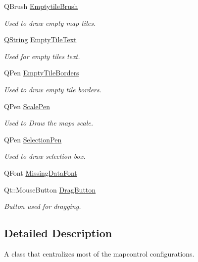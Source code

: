 \begin{DoxyCompactItemize}
\item 
Q\-Brush \hyperlink{group___o_p_map_widget_gad6bf957803f87dacf49bbff6998c72b6}{Emptytile\-Brush}
\begin{DoxyCompactList}\small\item\em Used to draw empty map tiles. \end{DoxyCompactList}\item 
\hyperlink{group___u_a_v_objects_plugin_gab9d252f49c333c94a72f97ce3105a32d}{Q\-String} \hyperlink{group___o_p_map_widget_ga3cee2f55adac9ad6424d5ea36a1fec54}{Empty\-Tile\-Text}
\begin{DoxyCompactList}\small\item\em Used for empty tiles text. \end{DoxyCompactList}\item 
Q\-Pen \hyperlink{group___o_p_map_widget_gae8db48d6cb03fedba7aa82d206dc82eb}{Empty\-Tile\-Borders}
\begin{DoxyCompactList}\small\item\em Used to draw empty tile borders. \end{DoxyCompactList}\item 
Q\-Pen \hyperlink{group___o_p_map_widget_gab4e66a6217ae69c3344a0af8578f5932}{Scale\-Pen}
\begin{DoxyCompactList}\small\item\em Used to Draw the maps scale. \end{DoxyCompactList}\item 
Q\-Pen \hyperlink{group___o_p_map_widget_gab3ccb3d980f16de07166bad27b8ff4dc}{Selection\-Pen}
\begin{DoxyCompactList}\small\item\em Used to draw selection box. \end{DoxyCompactList}\item 
Q\-Font \hyperlink{group___o_p_map_widget_gacaef660cdedd3dc5c76abc6f6872b149}{Missing\-Data\-Font}
\item 
Qt\-::\-Mouse\-Button \hyperlink{group___o_p_map_widget_ga18190e2acae7a12ba6b598cf25244acf}{Drag\-Button}
\begin{DoxyCompactList}\small\item\em Button used for dragging. \end{DoxyCompactList}\end{DoxyCompactItemize}


\subsection{Detailed Description}
A class that centralizes most of the mapcontrol configurations. 


